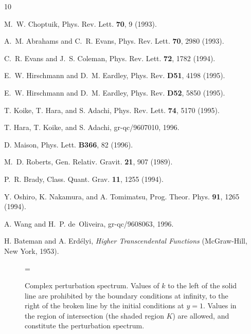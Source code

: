 \begin{thebibliography}{10}

M.~W. Choptuik, Phys. Rev. Lett. {\bf 70},  9  (1993).

A.~M. Abrahams and C.~R. Evans, Phys. Rev. Lett. {\bf 70},  2980  (1993).

C.~R. Evans and J.~S. Coleman, Phys. Rev. Lett. {\bf 72},  1782  (1994).

E.~W. Hirschmann and D.~M. Eardley, Phys. Rev. {\bf D51},  4198  (1995).

E.~W. Hirschmann and D.~M. Eardley, Phys. Rev. {\bf D52},  5850  (1995).

T. Koike, T. Hara, and S. Adachi, Phys. Rev. Lett. {\bf 74},  5170  (1995).

T. Hara, T. Koike, and S. Adachi, gr-qc/9607010, 1996.

D. Maison, Phys. Lett. {\bf B366},  82  (1996).

M.~D. Roberts, Gen. Relativ. Gravit. {\bf 21},  907  (1989).

P.~R. Brady, Class. Quant. Grav. {\bf 11},  1255  (1994).

Y. Oshiro, K. Nakamura, and A. Tomimatsu, Prog. Theor. Phys. {\bf 91},  1265
  (1994).

A. Wang and H.~P. de~Oliveira, gr-qc/9608063, 1996.

H. Bateman and A. Erd\'{e}lyi, {\em Higher Transcendental Functions}
  (McGraw-Hill, New York, 1953).

\end{thebibliography}



\begin{figure}
\centerline{
  \epsfxsize=\columnwidth \multiply{} \divide{}
}
\caption{
  Complex perturbation spectrum. Values of $k$ to the left of the solid
  line are prohibited by the boundary conditions at infinity, to the
  right of the broken line by the initial conditions at $y=1$. Values
  in the region of intersection (the shaded region $K$) are allowed,
  and constitute the perturbation spectrum.
} 
\label{fig:spectrum}
\end{figure}



